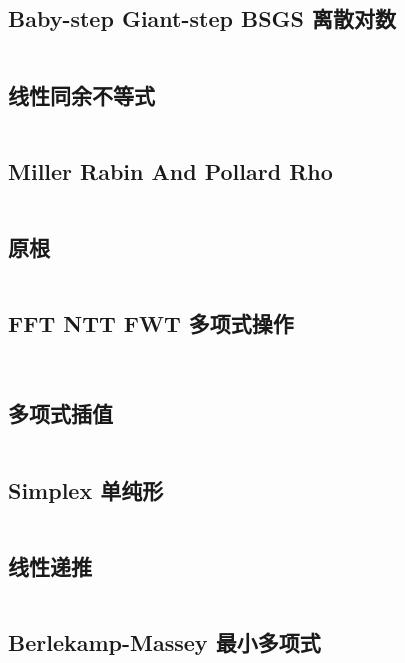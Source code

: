 \documentclass[titlepage, a4paper]{article}
\begin{document}
\begin{multicols}{2}
\begin{spacing}{0.6}
				\subsection{Baby-step Giant-step BSGS 离散对数}
				\inputminted{cpp}{src/Math/BSGS.cpp}
				\subsection{线性同余不等式}
				\inputminted{cpp}{src/Math/线性同余不等式.cpp}
				\subsection{Miller Rabin And Pollard Rho}
				\inputminted{cpp}{src/Math/Miller Rabin And Pollard Rho.cpp}
				
				\subsection{原根}
				\inputminted{cpp}{src/Math/原根.cpp}
				\subsection{FFT NTT FWT 多项式操作}
				\inputminted{cpp}{src/Math/FFT NTT FWT.cpp}
				
				\inputminted{cpp}{src/Math/Polynomial.cpp}
				
				\subsection{多项式插值}
				\inputminted{cpp}{src/Math/插值.cpp}
				\subsection{Simplex 单纯形}
				\inputminted{cpp}{src/Math/Simplex.cpp}
				\subsection{线性递推}
				\inputminted{cpp}{src/Math/线性递推.cpp}
				\subsection{Berlekamp-Massey 最小多项式}
				\inputminted{cpp}{src/Math/Berlekamp-Massey.cpp}

\end{spacing}
\end{multicols}
\end{document}

